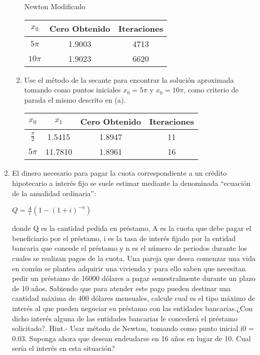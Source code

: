 \documentclass{udpreport}
\begin{document}
\begin{enumerate}
\begin{enumerate}
        		\begin{table} [H]Newton Modificado
        			\centering
        			\begin{tabular}{|c|c|c|}
        				\hline
        				$x_{0}$ & Cero Obtenido & Iteraciones\\
        				\hline
        				$5\pi$ & 1.9003 & 4713 \\
        				\hline 
        				$10\pi$ & 1.9023 & 6620\\
        				\hline
        			\end{tabular}
        		\end{table}
        		
        \item Use el método de la secante para encontrar la solución aproximada tomando como puntos iniciales $x_{0}=5\pi$ y $x_{0}=10\pi$, como criterio de parada el mismo descrito en (a).
        	\begin{table} [H] 
        			\centering
        			\begin{tabular}{|c|c|c|c|}
        				\hline
        				$x_{0}$& $x_{1}$ & Cero Obtenido & Iteraciones\\
        				\hline
        				$\frac{\pi}{2}$ & 1.5415 & 1.8947 & 11 \\
        				\hline 
        				$5\pi$& 11.7810 & 1.8961     &16\\
        				\hline
        			\end{tabular}
        		\end{table}
        		
        		
        
       
        
    \end{enumerate}
		

\item El dinero necesario para pagar la cuota correspondiente a un crédito hipotecario a interés fijo se suele
estimar mediante la denominada “ecuación de la anualidad ordinaria”:
\begin{center}
    $ Q = \frac{A}{i}(1-(1+i)^{-n}) $
\end{center}
donde Q es la cantidad pedida en préstamo, A es la cuota que debe pagar el beneficiario por el
préstamo, i es la tasa de interés fijado por la entidad bancaria que concede el préstamo y n es el
número de periodos durante los cuales se realizan pagos de la cuota.
Una pareja que desea comenzar una vida en común se plantea adquirir una vivienda y para ello saben
que necesitan pedir un préstamo de 16000 dólares a pagar semestralmente durante un plazo de 10 años.
Sabiendo que para atender este pago pueden destinar una cantidad máxima de 400 dólares mensuales,
calcule cual es el tipo máximo de interés al que pueden negociar su préstamo con las entidades bancarias.¿Con dicho interés alguna de las entidades bancarias le concederá el préstamo solicitado?.
Hint.- Usar método de Newton, tomando como punto inicial i0 = 0.03.
Suponga ahora que desean endeudarse en 16 años en lugar de 10. Cual sería el interés en esta situación?



\end{enumerate}
\end{document}
